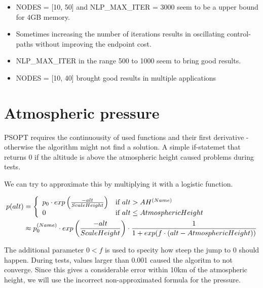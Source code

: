 \documentclass[11pt]{report}
\begin{document}
\begin{itemize}
\item NODES = [10, 50] and NLP\_MAX\_ITER = 3000 seem to be a upper
  bound for 4GB memory.
\item Sometimes increasing the number of iterations results in
  oscillating control-paths without improving the endpoint cost.
\item NLP\_MAX\_ITER in the range 500 to 1000 seem to bring good
  results.
\item NODES = [10, 40] brought good results in multiple applications
\end{itemize}

\section{Atmospheric pressure}

PSOPT requires the continuousity of used functions and their first
derivative - otherwise the algorithm might not find a solution. A
simple if-statemet that returns 0 if the altitude is above the
atmospheric height caused problems during tests.

We can try to approximate this by multiplying it with a logistic
function.

\begin{align}
  p(alt) &=
  \left\{
      \begin{array}{l l}
        p_0 \cdot exp\left({\frac{-alt}{ScaleHeight}}\right) & \textrm{if } alt > AH^{(Name)}\\
        0 &\textrm{if } alt \leq AtmosphericHeight
      \end{array}
    \right.\nonumber\\
    &\approx p_0^{(Name)} \cdot exp\left({\frac{-alt}{ScaleHeight}}\right) \cdot \frac{1}{1 + exp(f \cdot(alt - AtmosphericHeight))}
\end{align}

The additional parameter $0 < f$ is used to specity how steep the jump
to 0 should happen. During tests, values larger than 0.001 caused the
algoritm to not converge.  Since this gives a considerable error
within 10km of the atmospheric height, we will use the incorrect
non-approximated formula for the pressure.
\end{document}
